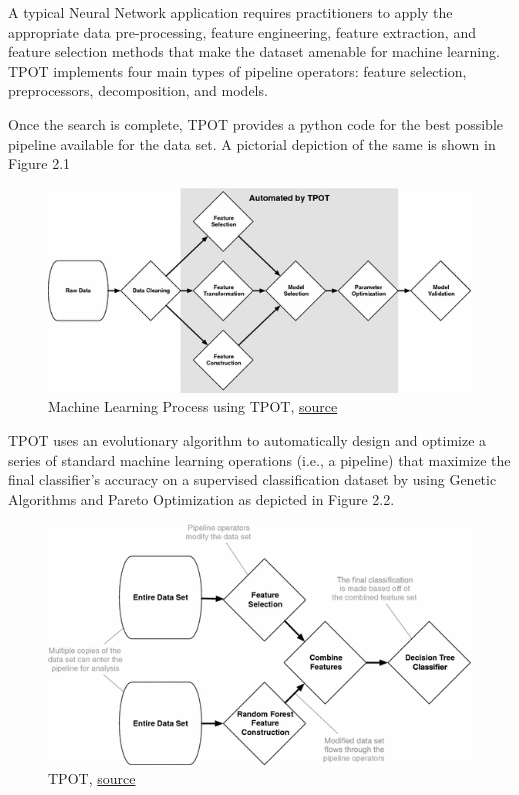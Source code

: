 A typical Neural Network application requires practitioners to apply the appropriate data pre-processing, feature engineering, feature extraction, and feature selection methods that make the dataset amenable for machine learning. TPOT implements four main types of pipeline operators: feature selection, preprocessors, decomposition, and models\cite{olson2016evaluation}. 

Once the search is complete, TPOT provides a python code for the best possible pipeline available for the data set. A pictorial depiction of the same is shown in Figure 2.1
\begin{figure}
	\centering
	\includegraphics[width=1.0\columnwidth]{introduction/fig1h.png}
	\caption{Machine Learning Process using TPOT, \href{https://media.springernature.com/original/springer-static/image/chp\%3A10.1007\%2F978-3-319-31204-0_9/MediaObjects/419269_1_En_9_Fig1_HTML.gif}{source}}
\end{figure}

TPOT uses an evolutionary algorithm to automatically design and optimize a series of standard machine learning operations (i.e., a pipeline) that maximize the final classifier’s accuracy on a supervised classification dataset by using Genetic Algorithms and Pareto Optimization as depicted in Figure 2.2. 

\begin{figure}
	\centering
	\includegraphics[width=1.0\columnwidth]{introduction/fig1i.png}
	\caption{TPOT, \href{https://media.springernature.com/original/springer-static/image/chp\%3A10.1007\%2F978-3-319-31204-0_9/MediaObjects/419269_1_En_9_Fig2_HTML.gif}{source}}
\end{figure}

